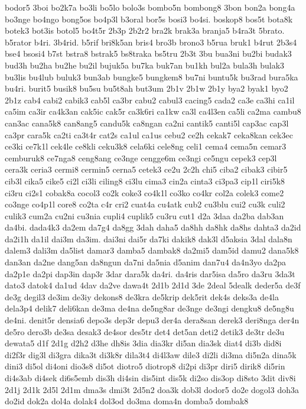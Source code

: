 {bodor5 3boi bo2k7a bo3li bo5lo bolo3s bombo5n bombong8 3bon bon2a bong4a
bo3nge bo4ngo bong5os bo4p3l b3oral bor5s bosi3 bo4si. boskop8 bos5t
bota8k botek3 bot3is botol5 bo4t5r 2b3p 2b2r2 bra2k brak3a branja5 b4ra3t
5brato. b5rator b4ri. 3b4rid. b5rif bri8k5an bris4 bro3b brono3 b5rua
bruk1 b4rut 2b3s4 bse4 bsosi4 b7st bstra8 bstrak5 bs8traka bs5tru 2b3t 3bu
bua3ni bu2bi budak3 bud3h bu2ha bu2he bu2il bujuk5a bu7ka buk7an bu1kh
bul2a bula3h bulak3 bu3lis bu4lub buluk3 bun3ab bungke5 bungkem8 bu7ni
buntu5k bu3rad bura5ka bu4ri. burit5 busik8 bu5su bu5t8ah but3um 2b1v 2b1w
2b1y bya2 byak1 byo2 2b1z cab4 cabi2 cabik3 cab5l ca3br cabu2 cabul3
cacing5 cada2 ca3e ca3hi ca1il ca5im ca3ir ca4k3an cak5ic cak5r ca3k6ri
ca1kw ca3l ca4l3en ca5li ca2ma cambu8 can3ac cana5k8 can8ang5 candu5k
ca8ngan ca2ni cantik5 canti5l cap3ac cap3l ca3pr cara5k ca2ti ca3t4r cat2s
ca1ul ca1us cebu2 ce2h cekak7 ceka8kan cek3ec ce3ki ce7k1l cek4le ce8kli
ceku3k8 cela6ki cele8ng celi1 cema4 cema5n cemar3 cemburuk8 ce7nga8
ceng8ang ce3nge cengge6m ce3ngi ce5ngu cepek3 cep3l cera3k ceria3 cermi8
cermin5 cerna5 cetek3 ce2u 2c2h chi5 ciba2 cibak3 cibir5 cib3l cika5 cike5
ci2l ci3li ciling8 ci3lu cima3 cin2a cinta3 ci3pa3 cip1l ciri5k8 ci3ru
ci2s1 cobak8a cocol3 co2k coke3 co4k1l co3ko co4kr col2a colek3 come2
co3nge co4p1l core8 co2ta c4r cri2 cuat4a cu4atk cub2 cu3blu cui2 cu3k
culi2 culik3 cum2a cu2ni cu3nia cupli4 cuplik5 cu3ru cut1 d2a 3daa da2ba
dab3an da4bi. dada4k3 da2em da7g4 da8gg 3dah daha5 da8hh da8hk da8hs
dahta3 da2id da2i1h da1il dai3m da3im. dai3ni dai5r da7ki dakik8 dak3l
d5aksia 3dal dala8n dalem3 dali3m da5list damar3 damba5 dambak8 da2mi5
dam5id damu2 dana5k8 dan3an da2ne dang5an da8ngun da7ni da5nia d5anim
dan7u4 da4n3yo da2pa da2p1e da2pi dap3in dap3r 3dar dara5k da4ri. da4ris
dar5isa da5ro da3ru 3da3t dato3 datok4 da1ud 4dav da2ve dawa4t 2d1b 2d1d
3de 2deal 5dealk deder5a de3f de3g degil3 de3im de3iy dekons8 de3kra
de5krip dek5rit dek4s deks3a de4la dela3p4 delik7 deli6kan de3ma de4na
de5ng8ar de3nge de3ngi dengku8 de5ng8u de4ni. denit5r densia6 depo3s dep3r
depu3 der4a dera8san derek3 deri8nga der4n de5ro dero3b de3sa desak3
de4sor des5tr det4 det5an deti2 detik3 de3tr de3u dewata5 d1f 2d1g d2h2
d3he dh8is 3dia dia3kr di5an dia3sk diat4 di3b did8i di2f3r dig3l di3gra
dika3t di3k8r dila3t4 di4l3aw dile3 di2li di3ma di5n2a dina5k dini3 di5ol
di4oni dio3s8 di5ot diotro5 diotrop8 di2pi di3pr diri5 dirik8 di5rin
di4s3ab di4sek di6s5emb dis3h di4sin dis5int dis5k di2so dis3op di8sto
3dit div8i 2d1j 2d1k 2d5l 2d1m dma3s dmi3t 2d5n2 doa3k dob3l dodor5 do2e
dogol3 doh3a do2id dok2a dol4a dolak4 dol3od do3ma doma4n domba5 dombak8
}
